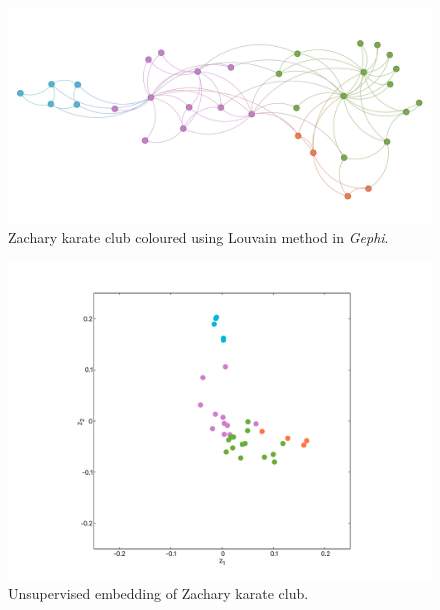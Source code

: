\documentclass[mathserif,10pt]{beamer}
\begin{document}
\begin{frame}
  \begin{figure}
    \includegraphics[scale=0.09]{figs/zachary.jpg}
    \caption{Zachary karate club coloured using Louvain method in \emph{Gephi}.}
  \end{figure}
\end{frame}

\begin{frame}
  \begin{figure}
    \includegraphics[scale=0.25]{figs/fig01b.pdf}
    \caption{Unsupervised embedding of Zachary karate club.}
  \end{figure}
\end{frame}
\end{document}
